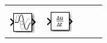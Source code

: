 \documentclass[margin=normal]{tex/hsrzf}
\begin{document}
\begin{tabular}{|c|c|c|c|c|}
      \textbf{}                                                     &
      \textbf{}                                                       \\
      \includegraphics[]{img/matlab/transport_delay_block_icon.png} &
      \includegraphics[]{img/matlab/derivative_block_icon.png}      &
      &
      &
      \\
      \hline
\end{tabular}
\end{document}
